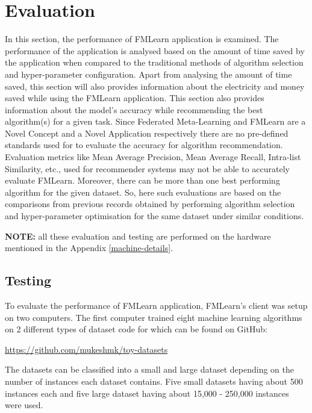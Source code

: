 \chapter{Evaluation}

In this section, the performance of FMLearn application is examined. The performance of the application is analysed based on the amount of time saved by the application when compared to the traditional methods of algorithm selection and hyper-parameter configuration. Apart from analysing the amount of time saved, this section will also provides information about the electricity and money saved while using the FMLearn application. This section also provides information about the model's accuracy while recommending the best algorithm(s) for a given task. Since Federated Meta-Learning and FMLearn are a Novel Concept and a Novel Application respectively there are no pre-defined standards used for to evaluate the accuracy for algorithm recommendation. Evaluation metrics like Mean Average Precision, Mean Average Recall, Intra-list Similarity, etc., used for recommender systems may not be able to accurately evaluate FMLearn. Moreover, there can be more than one best performing algorithm for the given dataset. So, here such evaluations are based on the comparisons from previous records obtained by performing algorithm selection and hyper-parameter optimisation for the same dataset under similar conditions.

\textbf{NOTE:} all these evaluation and testing are performed on the hardware mentioned in the Appendix \ref{machine-details}.

\section{Testing}

To evaluate the performance of FMLearn application, FMLearn's client was setup on two computers. The first computer trained eight machine learning algorithms on 2 different types of dataset code for which can be found on GitHub:
\begin{center}
    \href{https://github.com/mukeshmk/toy-datasets}{https://github.com/mukeshmk/toy-datasets}
\end{center}

The datasets can be classified into a small and large dataset depending on the number of instances each dataset contains. Five small datasets having about 500 instances each and five large dataset having about 15,000 - 250,000 instances were used.

